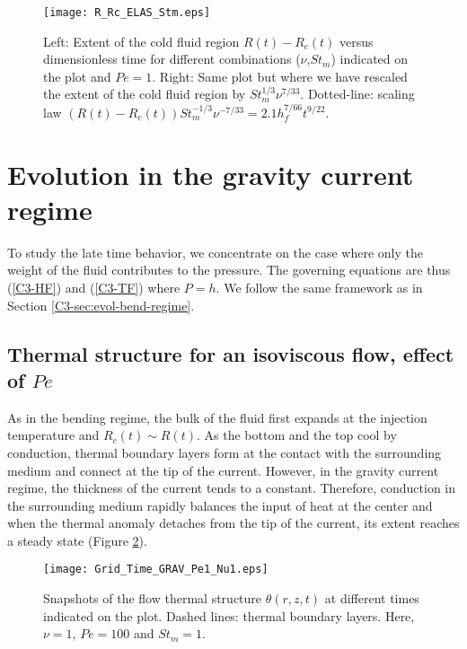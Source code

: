 \begin{figure}
  \begin{center}
    \graphicspath{ {/Users/thorey/Documents/These/Projet/Refroidissement/Skin_Model/Figure/JFM_V13/} }
    \texttt{[image: R\_Rc\_ELAS\_Stm.eps]}
    \caption{Left:  Extent  of  the cold  fluid  region  $R(t)-R_c(t)$
      versus   dimensionless    time   for    different   combinations
      ($\nu$,$St_m$) indicated  on the  plot and $Pe=1$.   Right: Same
      plot but  where we have  rescaled the  extent of the  cold fluid
      region  by  $St_m^{1/3}\nu^{7/33}$.   Dotted-line:  scaling  law
      $(R(t)-R_c(t))St_m^{-1/3}\nu^{-7/33}= 2.1 h_f^{7/66}t^{9/22}$.}
    \label{C3-R_Rc_ELAS_Stm}
  \end{center}
\end{figure}


\section{Evolution in the gravity current regime}
\label{C3-sec:evol-grav-curr-1}

To study the late time behavior, we concentrate on the case where only
the weight  of the fluid  contributes to the pressure.   The governing
equations are  thus (\ref{C3-HF})  and (\ref{C3-TF}) where  $P=h$.  We
follow the same framework as in Section \ref{C3-sec:evol-bend-regime}.

\subsection{Thermal structure for an isoviscous flow, effect of $Pe$}
\label{C3-sec:thermal-structure-an-1}
  
As in the bending  regime, the bulk of the fluid  first expands at the
injection temperature and  $R_c(t) \sim R(t)$.  As the  bottom and the
top cool  by conduction, thermal  boundary layers form at  the contact
with  the   surrounding  medium  and   connect  at  the  tip   of  the
current. However, in the gravity  current regime, the thickness of the
current tends to a constant.  Therefore, conduction in the surrounding
medium rapidly balances  the input of heat at the  center and when the
thermal  anomaly detaches  from the  tip  of the  current, its  extent
reaches a steady state (Figure \ref{C3-Grid_Time_GRAV}).

\begin{figure}
  \begin{center}
    \graphicspath{ {/Users/thorey/Documents/These/Projet/Refroidissement/Skin_Model/Figure/JFM_V13/} }
    \texttt{[image: Grid\_Time\_GRAV\_Pe1\_Nu1.eps]}
    \caption{Snapshots of  the flow thermal  structure $\theta(r,z,t)$
      at different times indicated on the plot.  Dashed lines: thermal
      boundary layers.  Here, $\nu=1$, $Pe =100$ and $St_m = 1$.}
    \label{C3-Grid_Time_GRAV}
  \end{center}
\end{figure}

